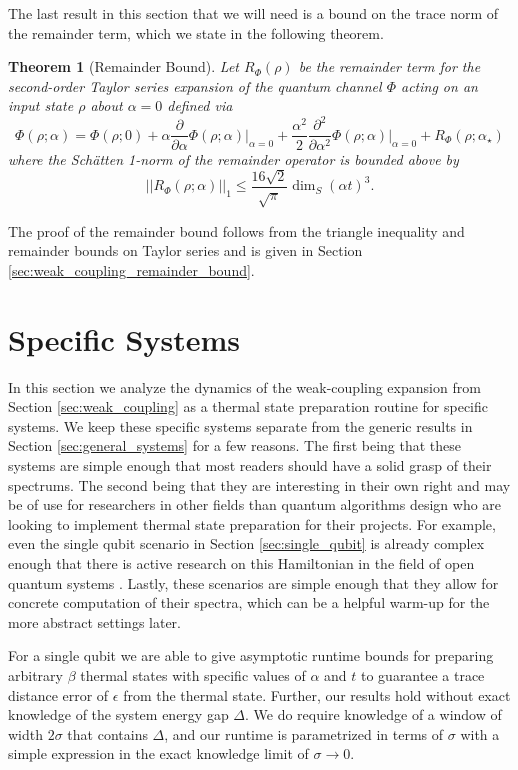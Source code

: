 \documentclass{article}
\newtheorem{theorem}{Theorem}
\newcommand{\norm}[1]{\left|\left| #1 \right|\right|}
\begin{document}
The last result in this section that we will need is a bound on the trace norm of the remainder term, which we state in the following theorem.
\begin{theorem}[Remainder Bound] \label{thm:remainder_bound}
    Let $R_{\Phi}(\rho)$ be the remainder term for the second-order Taylor series expansion 
of the quantum channel $\Phi$ acting on an input state $\rho$ about $\alpha=0$ defined via
    $$\Phi(\rho; \alpha) = \Phi(\rho; 0) + \alpha \frac{\partial}{\partial \alpha} \Phi(\rho; \alpha) \big|_{\alpha = 0} + \frac{\alpha^2}{2} \frac{\partial^2}{\partial \alpha^2} \Phi(\rho; \alpha) \big|_{\alpha = 0} + R_{\Phi}(\rho; \alpha_{\star})$$ where the Sch\"{a}tten 1-norm of the remainder operator is bounded above by
    \begin{equation}
        \norm{R_{\Phi}(\rho;\alpha)}_1 \le \frac{16 \sqrt{2}}{\sqrt{\pi}} \dim_S (\alpha t)^3.
    \end{equation}
\end{theorem}
The proof of the remainder bound follows from the triangle inequality and remainder bounds on Taylor series and is given in Section \ref{sec:weak_coupling_remainder_bound}.



\section{Specific Systems}
In this section we analyze the dynamics of the weak-coupling expansion from Section \ref{sec:weak_coupling} as a thermal state preparation routine for specific systems. We keep these specific systems separate from the generic results in Section \ref{sec:general_systems} for a few reasons. The first being that these systems are simple enough that most readers should have a solid grasp of their spectrums. The second being that they are interesting in their own right and may be of use for researchers in other fields than quantum algorithms design who are looking to implement thermal state preparation for their projects. For example, even the single qubit scenario in Section \ref{sec:single_qubit} is already complex enough that there is active research on this Hamiltonian in the field of open quantum systems \cite{prositto2025equilibrium}. Lastly, these scenarios are simple enough that they allow for concrete computation of their spectra, which can be a helpful warm-up for the more abstract settings later.

For a single qubit we are able to give asymptotic runtime bounds for preparing arbitrary $\beta$ thermal states with specific values of $\alpha$ and $t$ to guarantee a trace distance error of $\epsilon$ from the thermal state. Further, our results hold without exact knowledge of the system energy gap $\Delta$. We do require knowledge of a window of width $2 \sigma$ that contains $\Delta$, and our runtime is parametrized in terms of $\sigma$ with a simple expression in the exact knowledge limit of $\sigma \to 0$.
\end{document}
